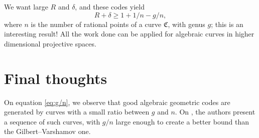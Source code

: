 \documentclass[11pt, oneside]{amsart}
\theoremstyle{definition}
\theoremstyle{remark}
\numberwithin{equation}{section}
\begin{document}
We want large $R$ and $\delta$, and these codes yield 
	\begin{equation}
		\label{eq:g/n} R + \delta \ge 1 + 1/n - g/n,
	\end{equation}
where $n$ is the number of rational points of a curve $\mathfrak C$, with genus $g$; this is an interesting result!
All the work done can be applied for algebraic curves in higher dimensional projective spaces.

\section{Final thoughts}\label{s:tvz}

On equation \eqref{eq:g/n}, we observe that good algebraic geometric codes are generated by curves with a small ratio between $g$ and $n$.
On \cite{TVZ82}, the authors present a sequence of such curves, with $g/n$ large enough to create a better bound than the Gilbert--Varshamov one.

\printbibliography
\end{document}
